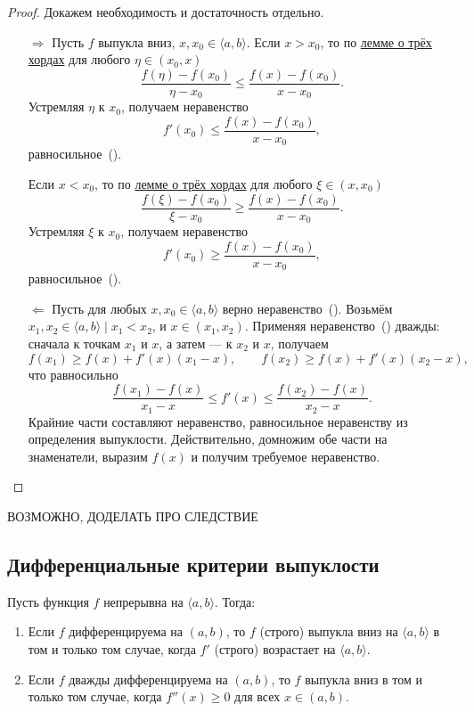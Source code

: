 \begin{proof}
	Докажем необходимость и достаточность отдельно.
	\begin{enumerate}
		\item[\(\Rightarrow\)] Пусть \(f\) выпукла вниз, \(x, x_0 \in \langle a, b \rangle\). Если \(x > x_0\), то по \hyperlink{trihordy}{лемме о трёх хордах} для любого \(\eta \in (x_0, x)\) \[
			\frac{f(\eta) - f(x_0)}{\eta - x_0} \leqslant \frac{f(x) - f(x_0)}{x - x_0}.
		\]
		Устремляя \(\eta\) к \(x_0\), получаем неравенство \[
			f'(x_0) \leqslant \frac{f(x) - f(x_0)}{x - x_0},
		\]
		равносильное~(\textasteriskcentered).
		
		Если \(x < x_0\), то по \hyperlink{trihordy}{лемме о трёх хордах} для любого \(\xi \in (x, x_0)\) \[
			\frac{f(\xi) - f(x_0)}{\xi - x_0} \geqslant \frac{f(x) - f(x_0)}{x - x_0}.
		\]
		Устремляя \(\xi\) к \(x_0\), получаем неравенство \[
			f'(x_0) \geqslant \frac{f(x) - f(x_0)}{x - x_0},
		\]
		равносильное~(\textasteriskcentered).
		\item[\(\Leftarrow\)] Пусть для любых \(x, x_0 \in \langle a, b \rangle\) верно неравенство~(\textasteriskcentered). Возьмём \(x_1, x_2 \in \langle a, b \rangle \mid x_1 < x_2\), и \(x \in (x_1, x_2)\). Применяя неравенство~(\textasteriskcentered) дважды: сначала к точкам \(x_1\) и \(x\), а затем --- к \(x_2\) и \(x\), получаем \[
			f(x_1) \geqslant f(x) + f'(x) (x_1 - x), \qquad f(x_2) \geqslant f(x) + f'(x) (x_2 - x),
		\]
		что равносильно \[
			\frac{f(x_1) - f(x)}{x_1 - x} \leqslant f'(x) \leqslant \frac{f(x_2) - f(x)}{x_2 - x}.
		\]
		Крайние части составляют неравенство, равносильное неравенству из определения выпуклости. Действительно, домножим обе части на знаменатели, выразим \(f(x)\) и получим требуемое неравенство.
	\end{enumerate}
\end{proof}

ВОЗМОЖНО, ДОДЕЛАТЬ ПРО СЛЕДСТВИЕ

\subsection{Дифференциальные критерии выпуклости}

\begin{theorem}
	Пусть функция \(f\) непрерывна на \(\langle a, b \rangle\). Тогда:
	\begin{enumerate}
		\item Если \(f\) дифференцируема на \((a, b)\), то \(f\) (строго) выпукла вниз на \(\langle a, b \rangle\) в том и только том случае, когда \(f'\) (строго) возрастает на \(\langle a, b \rangle\).
		\item Если \(f\) дважды дифференцируема на \((a, b)\), то \(f\) выпукла вниз в том и только том случае, когда \(f''(x) \geqslant 0\) для всех \(x \in (a, b)\).
	\end{enumerate}
\end{theorem}

